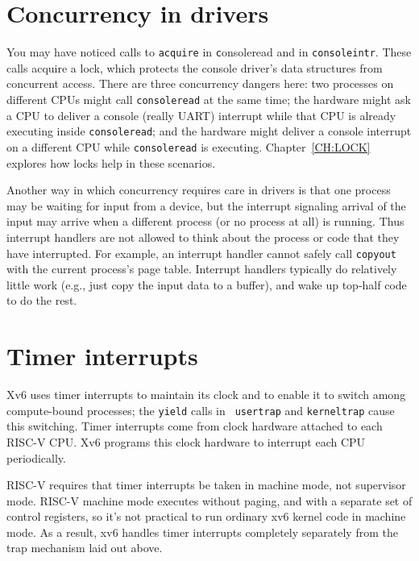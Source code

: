 \section{Concurrency in drivers}

You may have noticed calls to {\tt acquire} in {\texttt consoleread}
and in {\tt consoleintr}. These calls acquire a lock, which protects
the console driver's data structures from concurrent access.
There are three concurrency dangers here: two processes on
different CPUs might call {\tt consoleread} at the same time;
the hardware might ask a CPU to deliver a console (really 
UART) interrupt while that CPU is already executing inside
{\tt consoleread};
and the hardware might deliver a console interrupt on
a different CPU while {\tt consoleread} is executing.
Chapter~\ref{CH:LOCK} explores how locks help in
these scenarios.

Another way in which concurrency requires care in drivers is that one
process may be waiting for input from a device, but the interrupt
signaling arrival of the input may arrive when a different process (or
no process at all) is running. Thus interrupt handlers are not allowed
to think about the process or code that they have interrupted. For
example, an interrupt handler cannot safely call {\tt copyout} with
the current process's page table. Interrupt handlers typically do
relatively little work (e.g., just copy the input data to a buffer),
and wake up top-half code to do the rest.

\section{Timer interrupts}

Xv6 uses timer interrupts to maintain its clock and to enable it to
switch among compute-bound processes; the {\tt yield} calls in {\tt
  usertrap} and {\tt kerneltrap} cause this switching. Timer
interrupts come from clock hardware attached to each RISC-V CPU. Xv6
programs this clock hardware to interrupt each CPU periodically.

RISC-V requires that timer interrupts be taken in machine mode, not
supervisor mode. RISC-V machine mode executes without paging, and with
a separate set of control registers, so it's not practical to run
ordinary xv6 kernel code in machine mode. As a result, xv6 handles
timer interrupts completely separately from the trap mechanism laid
out above.


